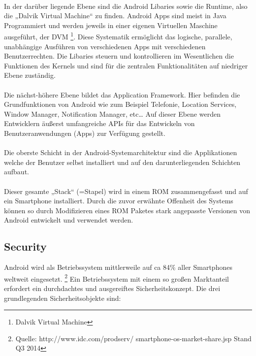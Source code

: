 \paragraph*{}
In der darüber liegende Ebene sind die Android Libaries sowie die Runtime, also die „Dalvik Virtual Machine“ zu finden. \newline
Android Apps sind meist in Java Programmiert und werden jeweils in einer eigenen Virtuellen Maschine ausgeführt, der DVM \footnote{Dalvik Virtual Machine}. Diese Systematik ermöglicht das logische, parallele, unabhängige Ausführen von verschiedenen Apps mit verschiedenen Benutzerrechten.
Die Libaries steuern und kontrollieren im Wesentlichen die Funktionen des Kernels und sind für die zentralen Funktionalitäten auf niedriger Ebene zuständig.
\paragraph*{}
Die nächst-höhere Ebene bildet das Application Framework. Hier befinden die Grundfunktionen von Android wie zum Beispiel Telefonie, Location Services, Window Manager, Notification Manager, etc… 
Auf dieser Ebene werden Entwicklern äußerst umfangreiche APIs für das Entwickeln von Benutzeranwendungen (Apps) zur Verfügung gestellt.
\paragraph*{}
Die oberste Schicht in der Android-Systemarchitektur sind die Applikationen welche der Benutzer selbst installiert und auf den darunterliegenden Schichten aufbaut.
\paragraph*{}
Dieser gesamte „Stack“ (=Stapel) wird in einem ROM zusammengefasst und auf ein Smartphone installiert. Durch die zuvor erwähnte Offenheit des Systems können so durch Modifizieren eines ROM Paketes stark angepasste Versionen von Android entwickelt und verwendet werden.


\subsection{Security}
Android wird als Betriebssystem mittlerweile auf ca 84\% aller Smartphones weltweit eingesetzt. \footnote{Quelle: http://www.idc.com/prodserv/									smartphone-os-market-share.jsp Stand Q3 2014} Ein Betriebssystem mit einem so großen Marktanteil erfordert ein durchdachtes und ausgereiftes Sicherheitskonzept.
Die drei grundlegenden Sicherheitsobjekte sind:

